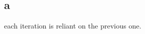 \documentclass [11pt]{article}
\begin{document}
\section{ }
\subsection{a}
each iteration is reliant on the previous one.
\end{document}
